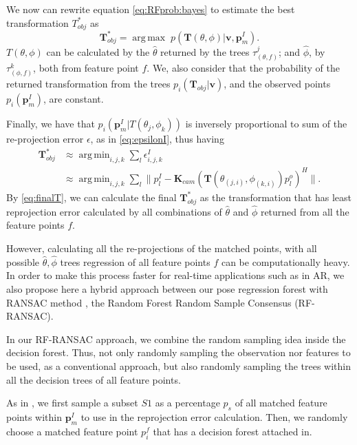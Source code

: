 \documentclass[annual]{acmsiggraph}
\DeclareMathOperator*{\argmax}{arg\,max}
\DeclareMathOperator*{\argmin}{arg\,min}
\begin{document}
We now can rewrite equation \eqref{eq:RFprob:bayes} to estimate the best transformation $T_{obj}^*$ as 
\begin{equation}
\mathbf{T}_{obj}^* = \argmax \; p(\mathbf{T}(\theta, \phi)| \mathbf{v}, \mathbf{p}^I_m).
\label{eq:argmaxForest}
\end{equation}	
$T(\theta,\phi)$ can be calculated by the $\hat{\theta}$ returned by the trees $\tau^j_{(\theta,f)}$; and $\hat{\phi}$, by $\tau^k_{(\phi,f)}$, both from feature point $f$. We, also consider that the probability of the returned transformation from the trees $p_i(\mathbf{T}_{obj}|\mathbf{v})$, and the observed points $p_i(\mathbf{p}^I_m)$, are constant. 

Finally, we have that $p_i(\mathbf{p}^I_m|T(\theta_j,\phi_k))$ is inversely proportional to sum of the re-projection error $\epsilon$, as in \eqref{eq:epsilonI}, thus having
\begin{equation}
\begin{split}
\mathbf{T}_{obj}^* &\approx \argmin_{i,j,k} \sum_l \epsilon^I_{i,j,k} \\
&\approx \argmin_{i,j,k} \sum_l \| p^I_{l} - \mathbf{K}_{cam}(\mathbf{T}(\theta_{(j,i)}, \phi_{(k,i)})p^o_l )^H \|.
\end{split}
\label{eq:finalT}
\end{equation} 
By \eqref{eq:finalT}, we can calculate the final $\mathbf{T}_{obj}^*$ as the transformation that has least reprojection error calculated by all combinations of $\hat{\theta}$ and $\hat{\phi}$ returned from all the feature points $f$.     

However, calculating all the re-projections of the matched points, with all possible $\hat{\theta},\hat{\phi}$ trees regression of all feature points $f$ can be computationally heavy. In order to make this process faster for real-time applications such as in AR, we also propose here a hybrid approach between our pose regression forest with RANSAC method \cite{Morel:2009}, the Random Forest Random Sample Consensus (RF-RANSAC).  

In our RF-RANSAC approach, we combine the random sampling idea inside the decision forest. Thus, not only randomly sampling the observation nor features to be used, as a conventional approach, but also randomly sampling the trees within all the decision trees of all feature points. 

As in \cite{Morel:2009}, we first sample a subset $S1$ as a percentage $p_{s}$ of all matched feature points within $\mathbf{p}^I_{m}$ to use in the reprojection error calculation. Then, we randomly choose a matched feature point $p^f_i$ that has a decision forest attached in. 
\end{document}
